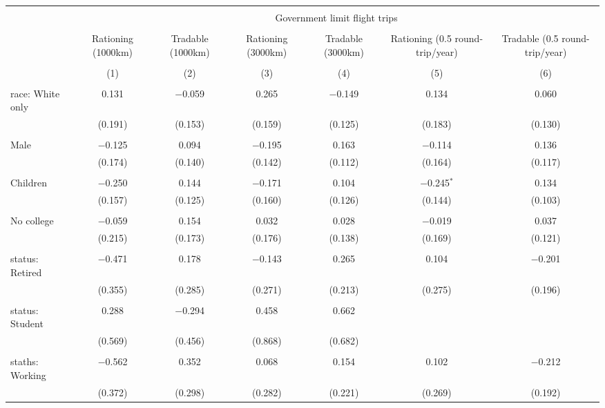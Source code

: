 
\begin{tabular}{@{\extracolsep{5pt}}lcccccc} 
\\[-1.8ex]\hline 
\hline \\[-1.8ex] 
 & \multicolumn{6}{c}{Government limit flight trips} \\ 
\cline{2-7} 
\\[-1.8ex] & Rationing (1000km) & Tradable (1000km) & Rationing (3000km) & Tradable (3000km) & Rationing (0.5 round-trip/year) & Tradable (0.5 round-trip/year) \\ 
\\[-1.8ex] & (1) & (2) & (3) & (4) & (5) & (6)\\ 
\hline \\[-1.8ex] 
 race: White only & 0.131 & $-$0.059 & 0.265 & $-$0.149 & 0.134 & 0.060 \\ 
  & (0.191) & (0.153) & (0.159) & (0.125) & (0.183) & (0.130) \\ 
  & & & & & & \\ 
 Male & $-$0.125 & 0.094 & $-$0.195 & 0.163 & $-$0.114 & 0.136 \\ 
  & (0.174) & (0.140) & (0.142) & (0.112) & (0.164) & (0.117) \\ 
  & & & & & & \\ 
 Children & $-$0.250 & 0.144 & $-$0.171 & 0.104 & $-$0.245$^{*}$ & 0.134 \\ 
  & (0.157) & (0.125) & (0.160) & (0.126) & (0.144) & (0.103) \\ 
  & & & & & & \\ 
 No college & $-$0.059 & 0.154 & 0.032 & 0.028 & $-$0.019 & 0.037 \\ 
  & (0.215) & (0.173) & (0.176) & (0.138) & (0.169) & (0.121) \\ 
  & & & & & & \\ 
 status: Retired & $-$0.471 & 0.178 & $-$0.143 & 0.265 & 0.104 & $-$0.201 \\ 
  & (0.355) & (0.285) & (0.271) & (0.213) & (0.275) & (0.196) \\ 
  & & & & & & \\ 
 status: Student & 0.288 & $-$0.294 & 0.458 & 0.662 &  &  \\ 
  & (0.569) & (0.456) & (0.868) & (0.682) &  &  \\ 
  & & & & & & \\ 
 staths: Working & $-$0.562 & 0.352 & 0.068 & 0.154 & 0.102 & $-$0.212 \\ 
  & (0.372) & (0.298) & (0.282) & (0.221) & (0.269) & (0.192) \\ 

\end{tabular}
